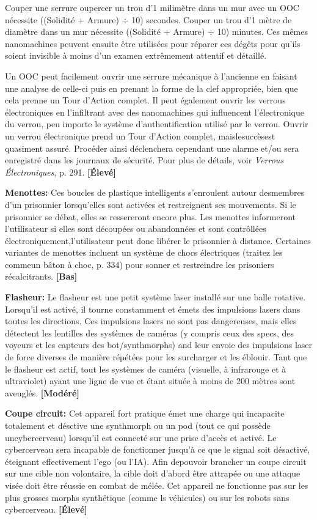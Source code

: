 Couper une serrure oupercer un trou d'1 milimètre dans un mur avec un OOC nécessite ((Solidité + Armure) $\div$ 10) secondes. Couper un trou d'1 mètre de diamètre dans un mur nécessite ((Solidité + Armure) $\div$ 10) minutes. Ces mêmes nanomachines peuvent ensuite être utilisées pour réparer ces dégêts pour qu'ils soient invisible à moins d'un examen extrêmement attentif et détaillé. 

Un OOC peut facilement ouvrir une serrure mécanique à l'ancienne en faisant une analyse de celle-ci puis en prenant la forme de la clef appropriée, bien que cela prenne un Tour d'Action complet. Il peut également ouvrir les verrous électroniques en l'infiltrant avec des nanomachines qui influencent l'électronique du verrou, peu importe le système d'authentification utilisé par le verrou. Ouvrir un verrou électronique prend un Tour d'Action complet, maislesuccèsest quasiment assuré. Procéder ainsi déclenchera cependant une alarme et/ou sera enregistré dans les journaux de sécurité. Pour plus de détails, voir \emph{Verrous Électroniques}, p. 291. \textbf{[Élevé]} 

\textbf{Menottes:} Ces boucles de plastique intelligents s'enroulent autour desmembres d'un prisonnier lorsqu'elles sont activées et restreignent ses mouvements. Si le prisonnier se débat, elles se ressereront encore plus. Les menottes informeront l'utilisateur si elles sont découpées ou abandonnées et sont contrôllées électroniquement,l'utilisateur peut donc libérer le prisonnier à distance. Certaines variantes de menottes incluent un système de chocs électriques (traitez les commeun bâton à choc, p. 334) pour sonner et restreindre les prisoniers récalcitrants. \textbf{[Bas]} 

\textbf{Flasheur:} Le flasheur est une petit système laser installé sur une balle rotative. Lorsqu'il est activé, il tourne constamment et émets des impulsions lasers dans toutes les directions. Ces impulsions lasers ne sont pas dangereuses, mais elles détectent les lentilles des systèmes de caméras (y compris ceux des specs, des voyeurs et les capteurs des bot/synthmorphs) and leur envoie des impulsions laser de force diverses de manière répétées pour les surcharger et les éblouir. Tant que le flasheur est actif, tout les systèmes de caméra (visuelle, à infrarouge et à ultraviolet) ayant une ligne de vue et étant située à moins de 200 mètres sont aveuglés. \textbf{[Modéré]} 

\textbf{Coupe circuit:} Cet appareil fort pratique émet une charge qui incapacite totalement et désctive une synthmorph ou un pod (tout ce qui possède uncybercerveau) lorsqu'il est connecté sur une prise d'accès et activé. Le cybercerveau sera incapable de fonctionner jusqu'à ce que le signal soit désactivé, éteignant effectivement l'ego (ou l'IA). Afin depouvoir brancher un coupe circuit sur une cible non volontaire, la cible doit d'abord être attrapée ou une attaque visée doit être réussie en combat de mélée. Cet appareil ne fonctionne pas sur les plus grosses morphs synthétique (comme ls véhicules) ou sur les robots sans cybercerveau. \textbf{[Élevé]} 

